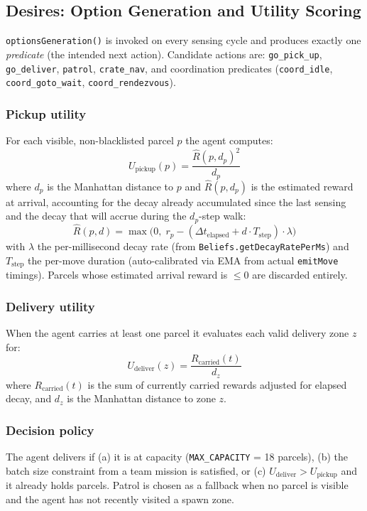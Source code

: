 \documentclass[10pt,a4paper,twocolumn]{article}
\begin{document}
\subsection{Desires: Option Generation and Utility Scoring}

\texttt{optionsGeneration()} is invoked on every sensing cycle and produces
exactly one \emph{predicate} (the intended next action).  Candidate actions are:
\texttt{go\_pick\_up}, \texttt{go\_deliver}, \texttt{patrol}, \texttt{crate\_nav},
and coordination predicates (\texttt{coord\_idle}, \texttt{coord\_goto\_wait},
\texttt{coord\_rendezvous}).

\subsubsection*{Pickup utility}
For each visible, non-blacklisted parcel $p$ the agent computes:
\[
  U_\text{pickup}(p) = \frac{\hat{R}(p, d_p)^2}{d_p}
\]
where $d_p$ is the Manhattan distance to $p$ and $\hat{R}(p, d_p)$ is the
estimated reward at arrival, accounting for the decay already accumulated since
the last sensing and the decay that will accrue during the $d_p$-step walk:
\[
  \hat{R}(p, d) = \max\!\bigl(0,\; r_p - (\Delta t_\text{elapsed} + d \cdot T_\text{step}) \cdot \lambda\bigr)
\]
with $\lambda$ the per-millisecond decay rate (from \texttt{Beliefs.getDecayRatePerMs})
and $T_\text{step}$ the per-move duration (auto-calibrated via EMA from actual
\texttt{emitMove} timings).  Parcels whose estimated arrival reward is $\leq 0$
are discarded entirely.

\subsubsection*{Delivery utility}
When the agent carries at least one parcel it evaluates each valid delivery zone
$z$ for:
\[
  U_\text{deliver}(z) = \frac{R_\text{carried}(t)}{d_z}
\]
where $R_\text{carried}(t)$ is the sum of currently carried rewards adjusted for
elapsed decay, and $d_z$ is the Manhattan distance to zone $z$.

\subsubsection*{Decision policy}
The agent delivers if (a) it is at capacity (\texttt{MAX\_CAPACITY} = 18 parcels),
(b) the batch size constraint from a team mission is satisfied, or (c)
$U_\text{deliver} > U_\text{pickup}$ and it already holds parcels.  Patrol is
chosen as a fallback when no parcel is visible and the agent has not recently
visited a spawn zone.
\end{document}
